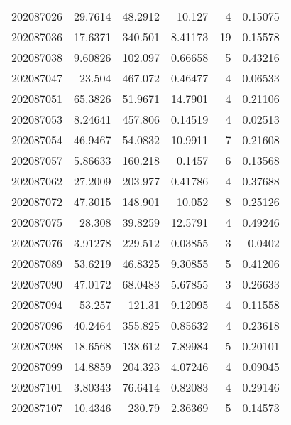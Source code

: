 \begin{tabular}{rrrrrr}
 202087026 &         29.7614  &       48.2912 &           10.127   &           4 & 0.15075 \\
 202087036 &         17.6371  &      340.501  &            8.41173 &          19 & 0.15578 \\
 202087038 &          9.60826 &      102.097  &            0.66658 &           5 & 0.43216 \\
 202087047 &         23.504   &      467.072  &            0.46477 &           4 & 0.06533 \\
 202087051 &         65.3826  &       51.9671 &           14.7901  &           4 & 0.21106 \\
 202087053 &          8.24641 &      457.806  &            0.14519 &           4 & 0.02513 \\
 202087054 &         46.9467  &       54.0832 &           10.9911  &           7 & 0.21608 \\
 202087057 &          5.86633 &      160.218  &            0.1457  &           6 & 0.13568 \\
 202087062 &         27.2009  &      203.977  &            0.41786 &           4 & 0.37688 \\
 202087072 &         47.3015  &      148.901  &           10.052   &           8 & 0.25126 \\
 202087075 &         28.308   &       39.8259 &           12.5791  &           4 & 0.49246 \\
 202087076 &          3.91278 &      229.512  &            0.03855 &           3 & 0.0402  \\
 202087089 &         53.6219  &       46.8325 &            9.30855 &           5 & 0.41206 \\
 202087090 &         47.0172  &       68.0483 &            5.67855 &           3 & 0.26633 \\
 202087094 &         53.257   &      121.31   &            9.12095 &           4 & 0.11558 \\
 202087096 &         40.2464  &      355.825  &            0.85632 &           4 & 0.23618 \\
 202087098 &         18.6568  &      138.612  &            7.89984 &           5 & 0.20101 \\
 202087099 &         14.8859  &      204.323  &            4.07246 &           4 & 0.09045 \\
 202087101 &          3.80343 &       76.6414 &            0.82083 &           4 & 0.29146 \\
 202087107 &         10.4346  &      230.79   &            2.36369 &           5 & 0.14573 \\

\end{tabular}

